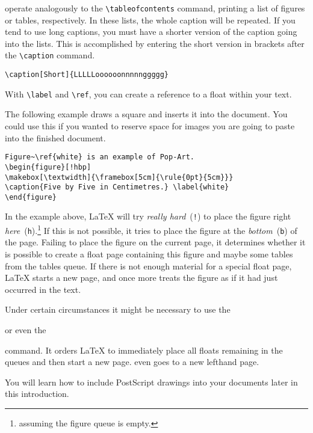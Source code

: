 \noindent operate analogously to the \verb|\tableofcontents| command,
printing a list of figures or tables, respectively.  In these lists,
the whole caption will be repeated. If you tend to use long captions,
you must have a shorter version of the caption going into the lists.
This is accomplished by entering the short version in brackets after
the \verb|\caption| command.
\begin{code}
\verb|\caption[Short]{LLLLLoooooonnnnnggggg}| 
\end{code}

With \verb|\label| and \verb|\ref|, you can create a reference to a float 
within your text.

The following example draws a square and inserts it into the
document. You could use this if you wanted to reserve space for images
you are going to paste into the finished document.

\begin{code}
\begin{verbatim}
Figure~\ref{white} is an example of Pop-Art.
\begin{figure}[!hbp]
\makebox[\textwidth]{\framebox[5cm]{\rule{0pt}{5cm}}}
\caption{Five by Five in Centimetres.} \label{white}
\end{figure}
\end{verbatim}
\end{code}

\noindent In the example above, 
\LaTeX{} will try \emph{really hard}~(\texttt{!}) to place the figure
right \emph{here}~(\texttt{h}).\footnote{assuming the figure queue is
  empty.} If this is not possible, it tries to place the figure at the
\emph{bottom}~(\texttt{b}) of the page.  Failing to place the figure
on the current page, it determines whether it is possible to create a float
page containing this figure and maybe some tables from the tables
queue. If there is not enough material for a special float page,
\LaTeX{} starts a new page, and once more treats the figure as if it
had just occurred in the text.

Under certain circumstances it might be necessary to use the 

\begin{command}
 or even the  
\end{command}

\noindent command. It orders \LaTeX{} to immediately place all 
floats remaining in the queues and then start a new
page.  even goes to a new lefthand page.

You will learn how to include PostScript
drawings into your \LaTeXe{} documents later in this introduction.

